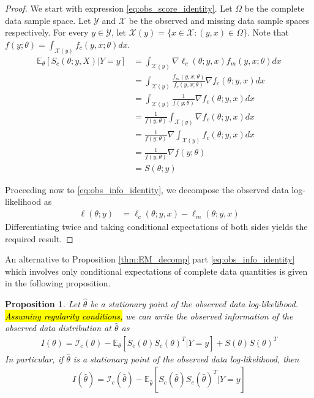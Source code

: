 \documentclass[11pt, oneside]{article}   	%
\newcommand{\bE}{\mathbb{E}}
\newtheorem{proposition}{Proposition}[section]
\begin{document}
\begin{proof}
    We start with expression \ref{eq:obs_score_identity}. Let $\Omega$ be the complete data sample space. Let $\mathcal{Y}$ and $\mathcal{X}$ be the observed and missing data sample spaces respectively. For every $y \in \mathcal{Y}$, let $\mathcal{X}(y) = \{ x \in \mathcal{X}: (y,x) \in \Omega\}$. Note that $f(y; \theta) = \int_{\mathcal{X}(y)} f_c(y, x; \theta) dx$.
    \begin{align}
        \bE_\theta [S_c(\theta; y, X)|Y=y] &= \int_{\mathcal{X}(y)} \nabla \ell_c(\theta; y, x) f_m(y, x; \theta) dx \nonumber\\
        &= \int_{\mathcal{X}(y)} \frac{f_m(y, x; \theta)}{f_c(y, x; \theta)} \nabla f_c(\theta; y, x) dx \nonumber\\
        &= \int_{\mathcal{X}(y)} \frac{1}{f(y; \theta)} \nabla f_c(\theta; y, x) dx\nonumber\\
        &= \frac{1}{f(y; \theta)} \int_{\mathcal{X}(y)} \nabla f_c(\theta; y, x) dx\nonumber\\
        &= \frac{1}{f(y; \theta)} \nabla \int_{\mathcal{X}(y)} f_c(\theta; y, x) dx \nonumber\\
        &= \frac{1}{f(y; \theta)} \nabla f(y; \theta)\nonumber\\
        &= S(\theta; y) \nonumber
    \end{align}

    Proceeding now to \ref{eq:obs_info_identity}, we decompose the observed data log-likelihood as
    \begin{align*}
        \ell(\theta; y) &= \ell_c(\theta; y, x) - \ell_m(\theta; y, x)
    \end{align*}
    Differentiating twice and taking conditional expectations of both sides yields the required result.
\end{proof}

An alternative to Proposition \ref{thm:EM_decomp} part \ref{eq:obs_info_identity} which involves only conditional expectations of complete data quantities is given in the following proposition.

\begin{proposition}
    \label{thm:info_decomp}
    Let $\hat{\theta}$ be a stationary point of the observed data log-likelihood. \hl{Assuming regularity conditions,} we can write the observed information of the observed data distribution at $\hat{\theta}$ as
    \begin{align}
        I(\theta) = \mathcal{I}_c(\theta) - \bE_{\theta} [ S_c(\theta) S_c(\theta)^T | Y=y] + S(\theta) S(\theta)^T
    \end{align}
    In particular, if $\hat{\theta}$ is a stationary point of the observed data log-likelihood, then
    \begin{align}
        I(\hat{\theta}) = \mathcal{I}_c(\hat{\theta})  - \bE_{\hat{\theta}} [ S_c(\hat{\theta}) S_c(\hat{\theta})^T | Y=y] \label{eq:info_at_MLE}
    \end{align}
\end{proposition}
\end{document}
